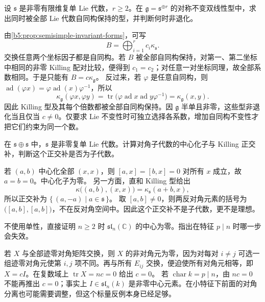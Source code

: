 \begin{exercise}\label{b5:ex:13-all-invariant-forms-semisimple}
	设 \(\mathfrak s\) 是非零有限维复单 Lie 代数，\(r\ge2\)。在 \(\mathfrak g=\mathfrak s^{\oplus r}\) 的对称不变双线性型中，求出同时被全部 Lie 代数自同构保持的型，并判断何时非退化。
\end{exercise}
\begin{solution}
	由\cref{b5:prop:semisimple-invariant-forms}，可写
	\[
		B=\bigoplus_{i=1}^r c_i\kappa_{\mathfrak s}.
	\]
	交换任意两个坐标因子都是自同构。若 \(B\) 被全部自同构保持，对第一、第二坐标中相同的非零 Killing 配对比较，便得到 \(c_1=c_2\)；对任意一对坐标同理，故全部系数相同。于是只能有 \(B=c\kappa_{\mathfrak g}\)。 反过来，若 \(\varphi\) 是任意自同构，则 \(\operatorname{ad}(\varphi x)=\varphi\operatorname{ad}(x)\varphi^{-1}\)，所以
	\[
		\kappa_{\mathfrak g}(\varphi x,\varphi y) =\operatorname{tr}\bigl(\varphi\operatorname{ad}x\operatorname{ad}y\varphi^{-1}\bigr) =\kappa_{\mathfrak g}(x,y).
	\]
	因此 Killing 型及其每个倍数都被全部自同构保持。因 \(\mathfrak g\) 半单且非零，这些型非退化当且仅当 \(c\ne0\)。仅要求 Lie 不变性时可独立选择各系数，增加自同构不变性才把它们约束为同一个数。
\end{solution}

\begin{exercise}\label{b5:ex:13-diagonal-perpendicular}
	在 \(\mathfrak s\oplus\mathfrak s\) 中，\(\mathfrak s\) 是非零复单 Lie 代数。计算对角子代数的中心化子与 Killing 正交补，判断这个正交补是否为子代数。
\end{exercise}
\begin{solution}
	若 \((a,b)\) 中心化全部 \((x,x)\)，则 \([a,x]=[b,x]=0\) 对所有 \(x\) 成立，故 \(a=b=0\)。中心化子为零。 另一方面，直和 Killing 型给出
	\[
		\kappa\bigl((a,b),(x,x)\bigr)=\kappa_{\mathfrak s}(a+b,x),
	\]
	所以正交补为 \(\bigl\{\,(a,-a)\mid a\in\mathfrak s\,\bigr\}\)。 取 \([a,b]\ne0\)，则两反对角元素的括号为 \(\bigl([a,b],[a,b]\bigr)\)，不在反对角空间中。因此这个正交补不是子代数，更不是理想。
\end{solution}

\begin{exercise}\label{b5:ex:13-sln-center-elementary}
	不使用单性，直接证明 \(n\ge2\) 时 \(\mathfrak{sl}_n(\mathbb C)\) 的中心为零。指出在特征 \(p\mid n\) 时哪一步会失效。
\end{exercise}
\begin{solution}
	若 \(X\) 与全部迹零对角矩阵交换，则 \(X\) 的非对角元为零，因为对每对 \(i\ne j\) 可选一组迹零对角元使第 \(i,j\) 项不同。再与所有 \(E_{ij}\) 交换，便迫使所有对角元相等，即 \(X=cI\)。在复数域上 \(\operatorname{tr}X=nc=0\) 给出 \(c=0\)。 若 \(\operatorname{char}k=p\mid n\)，由 \(nc=0\) 不能再推出 \(c=0\)；事实上 \(I\in\mathfrak{sl}_n(k)\) 是非零中心元素。在小特征下前面的对角分离也可能需要调整，但这个标量反例本身已经足够。
\end{solution}

